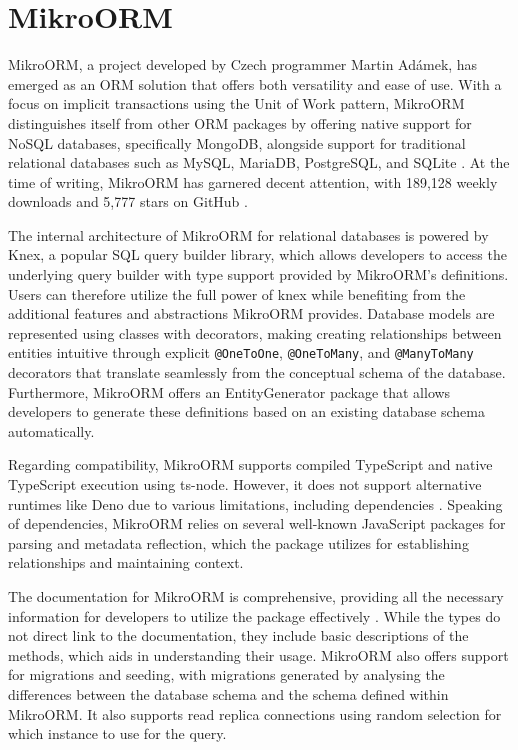 \section{MikroORM}

MikroORM, a project developed by Czech programmer Martin Adámek, has emerged as
an ORM solution that offers both versatility and ease of use. With a focus on
implicit transactions using the Unit of Work pattern, MikroORM distinguishes
itself from other ORM packages by offering native support for NoSQL databases,
specifically MongoDB, alongside support for traditional relational databases
such as MySQL, MariaDB, PostgreSQL, and SQLite \cite{mikroORMWeb}. At the time
of writing, MikroORM has garnered decent attention, with 189,128 weekly
downloads and 5,777 stars on GitHub \cite{mikroORMGitHub} \cite{mikroORMNpm}.

The internal architecture of MikroORM for relational databases is powered by
Knex, a popular SQL query builder library, which allows developers to access the
underlying query builder with type support provided by MikroORM's definitions.
Users can therefore utilize the full power of knex while benefiting from the
additional features and abstractions MikroORM provides. Database models are
represented using classes with decorators, making creating relationships between
entities intuitive through explicit \texttt{@OneToOne}, \texttt{@OneToMany}, and
\texttt{@ManyToMany} decorators that translate seamlessly from the conceptual
schema of the database. Furthermore, MikroORM offers an EntityGenerator package
that allows developers to generate these definitions based on an existing
database schema automatically.

Regarding compatibility, MikroORM supports compiled TypeScript and native
TypeScript execution using ts-node. However, it does not support alternative
runtimes like Deno due to various limitations, including dependencies
\cite{mikroORMDeno}. Speaking of dependencies, MikroORM relies on several
well-known JavaScript packages for parsing and metadata reflection, which the
package utilizes for establishing relationships and maintaining context.

The documentation for MikroORM is comprehensive, providing all the necessary
information for developers to utilize the package effectively
\cite{mikroORMDocs}. While the types do not direct link to the documentation,
they include basic descriptions of the methods, which aids in understanding
their usage. MikroORM also offers support for migrations and seeding, with
migrations generated by analysing the differences between the database schema
and the schema defined within MikroORM. It also supports read replica
connections using random selection for which instance to use for the query.

